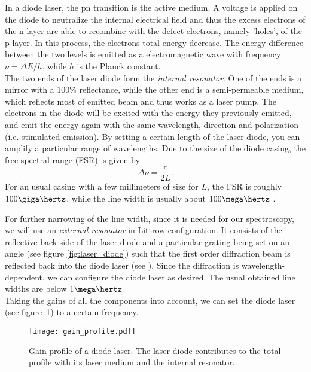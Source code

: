 In a diode laser, the pn transition is the active medium. A voltage is applied on the diode to neutralize the internal electrical field and thus the excess electrons of the n-layer are able to recombine with the defect electrons, namely 'holes', of the p-layer. In this process, the electrons total energy decrease. The energy difference between the two levels is emitted as a electromagnetic wave with frequency $\nu=\Delta E/h$, while $h$ is the Planck constant.\\
The two ends of the laser diode form the \emph{internal resonator}. One of the ends is a mirror with a 100\% reflectance, while the other end is a semi-permeable medium, which reflects most of emitted beam and thus works as a laser pump. The electrons in the diode will be excited with the energy they previously emitted, and emit the energy again with the same wavelength, direction and polarization (i.e. stimulated emission). By setting a certain length of the laser diode, you can amplify a particular range of wavelengths. Due to the size of the diode casing, the free spectral range (FSR) is given by
\begin{equation}
\Delta \nu=\frac{c}{2L}.
\end{equation}
For an usual casing with a few millimeters of size for $L$, the FSR is roughly $100\giga\hertz$, while the line width is usually about $100\mega\hertz$ \cite{lit:AK_manual2012}.

For further narrowing of the line width, since it is needed for our spectroscopy, we will use an \emph{external resonator} in Littrow configuration. It consists of the reflective back side of the laser diode and a particular grating being set on an angle (see figure \ref{fig:laser_diode}) such that the first order diffraction beam is reflected back into the diode laser (see \cite{lit:AK_manual2012}). Since the diffraction is wavelength-dependent, we can configure the diode laser as desired. The usual obtained line widths are below $1\mega\hertz$.\\
Taking the gains of all the components into account, we can set the diode laser (see figure~\ref{fig:gain_profiles}) to a certain frequency.
\begin{figure}[h]
	\centering
	\texttt{[image: gain\_profile.pdf]}
	\caption[Gain profile of a diode laser]{Gain profile of a diode laser. The laser diode contributes to the total profile with its laser medium and the internal resonator. }
	\label{fig:gain_profiles}
\end{figure}

